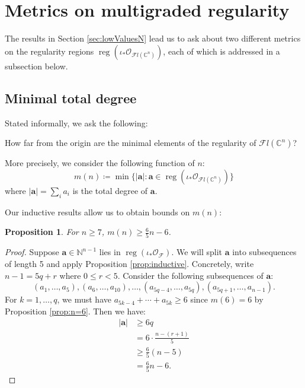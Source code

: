 \documentclass[12pt,reqno]{amsart}
\newtheorem{proposition}[theorem]{Proposition}
\theoremstyle{definition}
\theoremstyle{remark}
\newcommand{\reg}{\operatorname{reg}}
\newcommand{\calF}{{\mathcal{F}}}
\newcommand{\calO}{{\mathcal{O}}}
\begin{document}
\fi


\section{Metrics on multigraded regularity}\label{sec:totalDegree}

The results in Section \ref{sec:lowValuesN} lead us to ask about two different metrics on the regularity regions $\reg(\iota_*\calO_{\calF l(\mathbb C^n)})$, each of which is addressed in a subsection below.

\subsection{Minimal total degree}

Stated informally, we ask the following:

\hspace{25pt} How far from the origin are the minimal elements of the regularity of $\calF l(\mathbb C^n)$?

More precisely, we consider the following function of $n$:
\begin{equation*}\label{eqn:m(n)}
    m(n) \coloneqq \min\{\lvert \mathbf{a} \rvert : \mathbf{a} \in \reg(\iota_*\calO_{\calF l(\mathbb C^n)})\}
\end{equation*}
where $\lvert \mathbf a \rvert = \sum_i a_i$ is the total degree of $\mathbf a$.

Our inductive results allow us to obtain bounds on $m(n)$:

\begin{proposition}\label{prop:m(n)lower}
    For $n \geq 7$, $m(n) \geq \frac{6}{5}n-6$.
\end{proposition}

\begin{proof}
    Suppose $\mathbf a \in \mathbb N^{n-1}$ lies in $\reg(\iota_*\calO_{\calF })$.  We will split $\mathbf a$ into subsequences of length 5 and apply Proposition \ref{prop:inductive}.  Concretely, write $n-1 = 5q+r$ where $0\leq r < 5$.  Consider the following subsequences of $\mathbf a$:
    \begin{equation*}
        (a_1,\ldots,a_5),  (a_6,\ldots,a_{10}),\ldots,( a_{5q-4},\ldots,a_{5q}),(a_{5q+1},\ldots,a_{n-1}).
    \end{equation*}
    For $k = 1,\ldots, q$, we must have $a_{5k-4}+\cdots + a_{5k} \geq 6$ since $m(6) = 6$ by Proposition \ref{prop:n=6}.  Then we have:
    \begin{align*}
        |\mathbf a| &\geq 6q\\
        &= 6\cdot \frac{n-(r+1)}{5}\\
        &\geq \frac{6}{5}(n-5)\\
        &= \frac{6}{5}n-6.
    \end{align*}
\end{proof}
\end{document}
